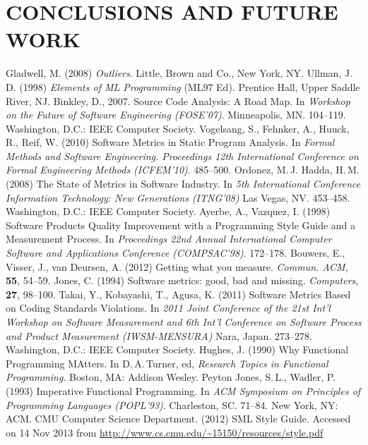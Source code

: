 \documentclass[12pt,abstracton]{scrartcl}
\begin{document}
\section{CONCLUSIONS AND FUTURE WORK}\label{sec:future}
\begin{thebibliography}{99}
 Gladwell, M. (2008) \emph{Outliers}. Little, Brown and Co., New York, NY.
 Ullman, J.\,D. (1998) \emph{Elements of ML Programming} (ML97 Ed). Prentice Hall, Upper Saddle River, NJ.
 Binkley, D., 2007. Source Code Analysis: A Road Map. In \emph{Workshop on the Future of Software Engineering (FOSE'07)}. Minneapolis, MN. 104--119. Washington, D.C.: IEEE Computer Society.
 Vogelsang, S., Fehnker, A., Huuck, R., Reif, W. (2010) Software Metrics in Static Program Analysis. In \emph{Formal Methods and Software Engineering. Proceedings 12th International Conference on Formal Engineering Methods (ICFEM'10)}. 485--500.
 Ordonez, M.\,J. Hadda, H.\,M. (2008) The State of Metrics in Software Industry. In \emph{5th International Conference Information Technology: New Generations (ITNG'08)} Las Vegas, NV. 453--458. Washington, D.C.: IEEE Computer Society.
 Ayerbe, A., Vazquez, I. (1998) Software Products Quality Improvement with a Programming Style Guide and a Measurement Process. In \emph{Proceedings 22nd Annual International Computer Software and Applications Conference (COMPSAC'98)}. 172--178.
 Bouwers, E., Visser, J., van Deursen, A. (2012) Getting what you measure. \emph{Commun. ACM}, \textbf{55}, 54--59.
 Jones, C. (1994) Software metrics: good, bad and missing. \emph{Computers}, \textbf{27}, 98--100.
 Takai, Y., Kobayashi, T., Agusa, K. (2011) Software Metrics Based on Coding Standards Violations. In \emph{2011 Joint Conference of the 21st Int'l Workshop on Software Measurement and 6th Int'l Conference on Software Process and Product Measurement (IWSM-MENSURA)} Nara, Japan. 273--278. Washington, D.C.: IEEE Computer Society.
 Hughes, J. (1990) Why Functional Programming MAtters. In D.\,A.\,Turner, ed, \emph{Research Topics in Functional Programming}. Boston, MA: Addison Wesley.
 Peyton Jones, S.\,L., Wadler, P. (1993) Imperative Functional Programming. In \emph{ACM Symposium on Principles of Programming Languages (POPL'93)}. Charleston, SC. 71--84. New York, NY: ACM.
 CMU Computer Science Department. (2012) SML Style Guide. Accessed on 14 Nov 2013 from \url{http://www.cs.cmu.edu/~15150/resources/style.pdf}
\end{thebibliography}
\end{document}
